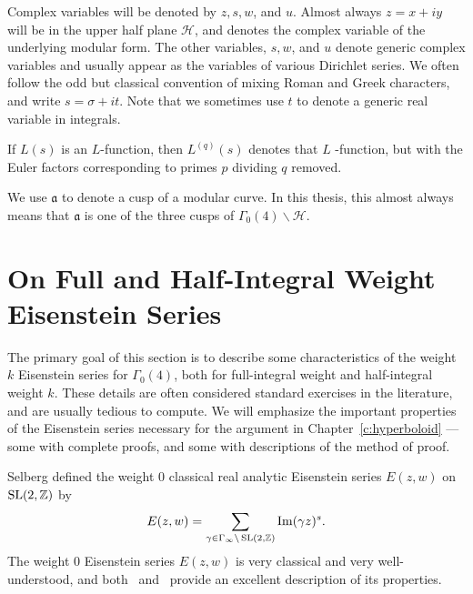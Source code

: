 Complex variables will be denoted by $z,s,w$, and $u$.
Almost always $z = x + iy$ will be in the upper half plane $\mathcal{H}$, and denotes the complex
variable of the underlying modular form.
The other variables, $s,w$, and $u$ denote generic complex variables and usually appear as
the variables of various Dirichlet series.
We often follow the odd but classical convention of mixing Roman and Greek characters, and
write $s = \sigma + it$.
Note that we sometimes use $t$ to denote a generic real variable in integrals.


If $L(s)$ is an $L$-function, then $L^{(q)}(s)$ denotes that $L$ -function, but with the
Euler factors corresponding to primes $p$ dividing $q$ removed.


We use $\mathfrak{a}$ to denote a cusp of a modular curve.
In this thesis, this almost always means that $\mathfrak{a}$ is one of the three cusps of
$\Gamma_0(4) \backslash \mathcal{H}$.




\section{On Full and Half-Integral Weight Eisenstein Series}\label{sec:Eisen_summary}


The primary goal of this section is to describe some characteristics of the weight $k$
Eisenstein series for $\Gamma_0(4)$, both for full-integral weight and half-integral
weight $k$.
These details are often considered standard exercises in the literature, and are usually
tedious to compute.
We will emphasize the important properties of the Eisenstein series necessary for the
argument in Chapter~\ref{c:hyperboloid} --- some with complete proofs, and some with
descriptions of the method of proof.


Selberg defined the weight $0$ classical real analytic Eisenstein series $E(z,w)$ on
$\operatorname{SL}(2, \mathbb{Z})$ by
\begin{equation}
  E(z,w) = \sum_{\gamma \in \Gamma_\infty \backslash \operatorname{SL}(2, \mathbb{Z})} \operatorname{Im} (\gamma z)^s.
\end{equation}
The weight $0$ Eisenstein series $E(z,w)$ is very classical and very well-understood, and
both~\cite[Chapter 3]{Goldfeld2006automorphic} and~\cite[Chapter 13]{Iwaniec97} provide an
excellent description of its properties.


